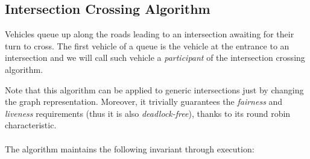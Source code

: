 \documentclass{memoir}
\begin{document}
\subsection{Intersection Crossing Algorithm}\label{sec:intersection-crossing-algorithm}
Vehicles queue up along the roads leading to an intersection awaiting for their turn to cross. The first vehicle of a queue is the vehicle at the entrance to an intersection and we will call such vehicle a \emph{participant} of the intersection crossing algorithm.

Note that this algorithm can be applied to generic intersections just by changing the graph representation. Moreover, it trivially guarantees the \emph{fairness} and \emph{liveness} requirements (thus it is also \emph{deadlock-free}), thanks to its round robin characteristic.
\\\\
\noindent
The algorithm maintains the following invariant through execution:
\end{document}
